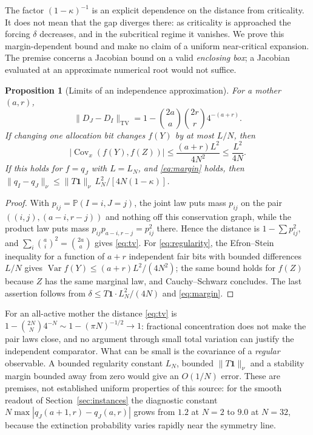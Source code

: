 \documentclass[11pt]{article}
\newtheorem{proposition}[theorem]{Proposition}
\theoremstyle{remark}
\newcommand{\one}{\mathbf 1}
\newcommand{\PP}{\mathbb P}
\newcommand{\Cov}{\operatorname{Cov}}
\newcommand{\Var}{\operatorname{Var}}
\newcommand{\TV}{\mathrm{TV}}
\begin{document}
The factor $(1-\kappa)^{-1}$ is an explicit dependence on the distance from
criticality. It does not mean that the gap diverges there: as criticality is
approached the forcing $\delta$ decreases, and in the subcritical regime it
vanishes. We prove this margin-dependent bound and make no claim of a uniform
near-critical expansion. The premise concerns a Jacobian bound on a valid
\emph{enclosing box}; a Jacobian evaluated at an approximate numerical root
would not suffice.

\begin{proposition}[Limits of an independence approximation]\label{prop:limits}
For a mother $(a,r)$,
\begin{equation}\label{eq:tv}
 \|D_J-D_I\|_{\TV}=1-\binom{2a}{a}\binom{2r}{r}4^{-(a+r)} .
\end{equation}
If changing one allocation bit changes $f(Y)$ by at most $L/N$, then
\begin{equation}\label{eq:regularity}
 \bigl|\Cov_x(f(Y),f(Z))\bigr|\le\frac{(a+r)L^2}{4N^2}\le\frac{L^2}{4N}.
\end{equation}
If this holds for $f=q_J$ with $L=L_N$, and \eqref{eq:margin} holds, then
$\|q_I-q_J\|_\nu\le\|T\one\|_\nu\,L_N^2/[4N(1-\kappa)]$.
\end{proposition}
\begin{proof}
With $p_{ij}=\PP(I=i,J=j)$, the joint law puts mass $p_{ij}$ on the pair
$((i,j),(a-i,r-j))$ and nothing off this conservation graph, while the
product law puts mass $p_{ij}p_{a-i,r-j}=p_{ij}^2$ there. Hence the distance
is $1-\sum p_{ij}^2$, and $\sum_i\binom ai^2=\binom{2a}a$ gives
\eqref{eq:tv}. For \eqref{eq:regularity}, the Efron--Stein inequality
\cite{efron1981} for a function of $a+r$ independent fair bits with bounded
differences $L/N$ gives $\Var f(Y)\le(a+r)L^2/(4N^2)$; the same bound holds
for $f(Z)$ because $Z$ has the same marginal law, and Cauchy--Schwarz
concludes. The last assertion follows from $\delta\le T\one\cdot L_N^2/(4N)$
and \eqref{eq:margin}.
\end{proof}

For an all-active mother the distance \eqref{eq:tv} is
$1-\binom{2N}N4^{-N}\sim1-(\pi N)^{-1/2}\to1$: fractional concentration does
not make the pair laws close, and no argument through small total variation
can justify the independent comparator. What can be small is the covariance
of a \emph{regular} observable. A bounded regularity constant $L_N$, bounded
$\|T\one\|_\nu$ and a stability margin bounded away from zero would give an
$O(1/N)$ error. These are premises, not established uniform properties of
this source: for the smooth readout of Section~\ref{sec:instances} the
diagnostic constant $N\max|q_J(a+1,r)-q_J(a,r)|$ grows from $1.2$ at $N=2$ to
$9.0$ at $N=32$, because the extinction probability varies rapidly near the
symmetry line.
\end{document}
